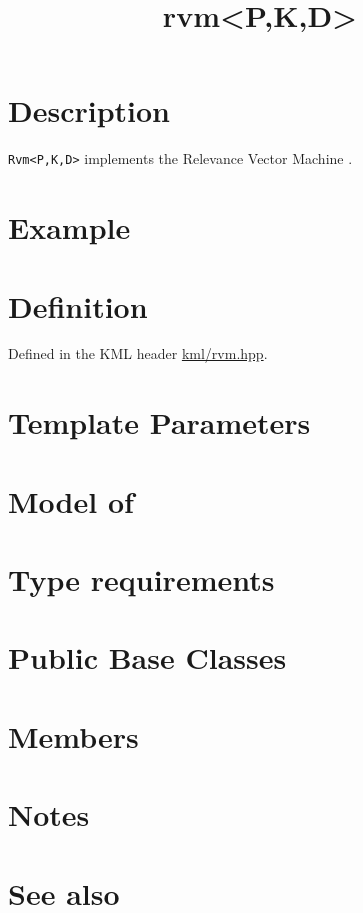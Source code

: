 \documentclass{article}
\begin{document}
\title{rvm<P,K,D>}
\maketitle

\section*{Description}

\texttt{Rvm<P,K,D>} implements the Relevance Vector Machine \cite{tipping03fast}.

\section*{Example}
\section*{Definition}

Defined in the KML header \href{\kmlsvnroot/kml/rvm.hpp}{kml/rvm.hpp}.

\section*{Template Parameters}
\section*{Model of}
\section*{Type requirements}
\section*{Public Base Classes}
\section*{Members}
\section*{Notes}
\section*{See also}



\end{document}
